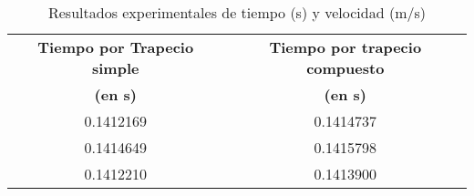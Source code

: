 \begin{table}[!ht]
\begin{center}
\begin{tabular}{|c|c|} \hline 
\textbf{Tiempo por Trapecio simple} & \textbf{Tiempo por trapecio compuesto} \\ 
\textbf{(en s)} & \textbf{(en s)} \\ \hline \hline
0.1412169 &
0.1414737
\\
\hline

0.1414649 &
0.1415798
\\
\hline

0.1412210 &
0.1413900
\\
\hline


\end{tabular}
\end{center}
\caption{Resultados experimentales de tiempo (s) y velocidad (m/s)}
\label{tab:1}
\end{table}

